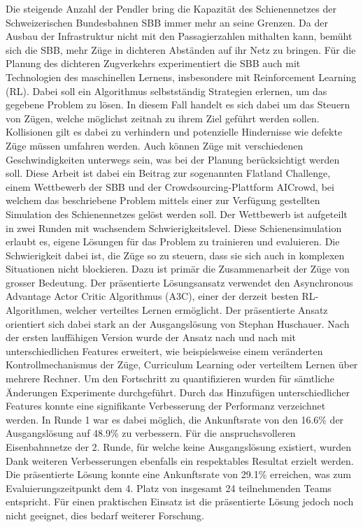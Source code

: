 Die steigende Anzahl der Pendler bring die Kapazität des Schienennetzes der Schweizerischen Bundesbahnen SBB immer mehr an seine Grenzen. Da der Ausbau der Infrastruktur nicht mit den Passagierzahlen mithalten kann, bemüht sich die SBB, mehr Züge in dichteren Abständen auf ihr Netz zu bringen.
Für die Planung des dichteren Zugverkehrs experimentiert die SBB auch mit Technologien des maschinellen Lernens, insbesondere mit Reinforcement Learning (RL). Dabei soll ein Algorithmus selbstständig Strategien erlernen, um das gegebene Problem zu lösen. In diesem Fall handelt es sich dabei um das Steuern von Zügen, welche möglichst zeitnah zu ihrem Ziel geführt werden sollen. Kollisionen gilt es dabei zu verhindern und potenzielle Hindernisse wie defekte Züge müssen umfahren werden. Auch können Züge mit verschiedenen Geschwindigkeiten unterwegs sein, was bei der Planung berücksichtigt werden soll. Diese Arbeit ist dabei ein Beitrag zur sogenannten Flatland Challenge, einem Wettbewerb der SBB und der Crowdsourcing-Plattform AICrowd, bei welchem das beschriebene Problem mittels einer zur Verfügung gestellten Simulation des Schienennetzes gelöst werden soll. Der Wettbewerb ist aufgeteilt in zwei Runden mit wachsendem Schwierigkeitslevel.
Diese Schienensimulation erlaubt es, eigene Lösungen für das Problem zu trainieren und evaluieren. Die Schwierigkeit dabei ist, die Züge so zu steuern, dass sie sich auch in komplexen Situationen nicht blockieren. Dazu ist primär die Zusammenarbeit der Züge von grosser Bedeutung.
Der präsentierte Lösungsansatz verwendet den Asynchronous Advantage Actor Critic Algorithmus (A3C), einer der derzeit besten RL-Algorithmen, welcher verteiltes Lernen ermöglicht. Der präsentierte Ansatz orientiert sich dabei stark an der Ausgangslösung von Stephan Huschauer.
Nach der ersten lauffähigen Version wurde der Ansatz nach und nach mit unterschiedlichen Features erweitert, wie beispielsweise einem veränderten Kontrollmechanismus der Züge, Curriculum Learning oder verteiltem Lernen über mehrere Rechner.
Um den Fortschritt zu quantifizieren wurden für sämtliche Änderungen Experimente durchgeführt. Durch das Hinzufügen unterschiedlicher Features konnte eine signifikante Verbesserung der Performanz verzeichnet werden. In Runde 1 war es dabei möglich, die Ankunftsrate von den 16.6\% der Ausgangslösung auf 48.9\% zu verbessern.
Für die anspruchsvolleren Eisenbahnnetze der 2. Runde, für welche keine Ausgangslösung existiert, wurden Dank weiteren Verbesserungen ebenfalls ein respektables Resultat erzielt werden. Die präsentierte Lösung konnte eine Ankunftsrate von 29.1\% erreichen, was zum Evaluierungszeitpunkt dem 4. Platz von insgesamt 24 teilnehmenden Teams entspricht. Für einen praktischen Einsatz ist die präsentierte Lösung jedoch noch nicht geeignet, dies bedarf weiterer Forschung.
\newpage
\thispagestyle{empty}
